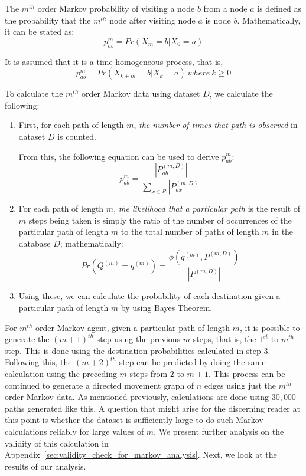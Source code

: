 The $m^{th}$ order Markov probability of visiting a node $b$ from a node $a$ is defined as the probability that the $m^{th}$ node after visiting node $a$ is node $b$. Mathematically, it can be stated as:
\begin{equation}
    p^{m}_{ab} = Pr(X_{m}=b|X_{0}=a)
\end{equation}

It is assumed that it is a time homogeneous process, that is,
\begin{equation}
    p^{m}_{ab} = Pr(X_{k+m}=b|X_{k}=a) \ where\  k \geq 0
\end{equation}



To calculate the $m^{th}$ order Markov data using dataset $D$, we calculate the following:
\begin{enumerate}
    \item First, for each path of length $m$, \emph{the number of times that path is observed} in dataset $D$ is counted.

    From this, the following equation can be used to derive $p^{m}_{ab}$:
    \begin{equation}
        p^{m}_{ab} = \frac{\left\vert{P^{(m,D)}_{ab}}\right\vert}{\sum\limits_{x\in R}\left\vert{P^{(m,D)}_{ax}}\right\vert}
        \label{eq:HeatMapEquation}
    \end{equation}

    \item For each path of length $m$, \emph{the likelihood that a particular path} is the result of $m$ steps being taken is simply the ratio of the number of occurrences of the particular path of length $m$ to the total number of paths of length $m$ in the database $D$; mathematically:
    \begin{equation}
        Pr(Q^{(m)}=q^{(m)}) = \frac{\phi(q^{(m)},P^{(m,D)})}{\left\vert{P^{(m,D)}}\right\vert}
        \label{eq:TableEquation}
    \end{equation}


    \item Using these, we can calculate the probability of each destination given a particular path of length $m$ by using Bayes Theorem.


\end{enumerate}

For $m^{th}$-order Markov agent, given a particular path of length $m$, it is possible to generate the $(m+1)^{th}$ step using the previous $m$ steps, that is, the $1^{st}$ to $m^{th}$ step. This is done using the destination probabilities calculated in step 3. Following this, the $(m+2)^{th}$ step can be predicted by doing the same calculation using the preceding $m$ steps from $2$ to $m+1$. This process can be continued to generate a directed movement graph of $n$ edges using just the $m^{th}$ order Markov data. As mentioned previously, calculations are done using $30,000$ paths generated like this. A question that might arise for the discerning reader at this point is whether the dataset is sufficiently large to do such Markov calculations reliably for large values of $m$. We present further analysis on the validity of this calculation in Appendix~\ref{sec:validity_check_for_markov_analysis}. Next, we look at the results of our analysis.

